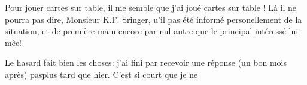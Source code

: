 Pour jouer cartes sur table, il me semble que j'ai joué cartes sur table ! Là il ne pourra pas dire, Monsieur K.F. Sringer, u'il  pas été informé personellement de la situation, et de première main encore\handwritten{,} par nul autre que le principal intéressé lui-mêe!

Le hasard fait bien les choses: j'ai  fini par recevoir une réponse (un bon mois après) pas\unsure{,|;}plus tard que hier. C'est si court que je ne
